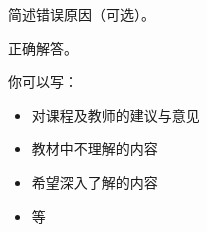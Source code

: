 \documentclass[11pt, a4paper, UTF8]{ctexart}
\begin{document}
\begin{cause}
  简述错误原因（可选）。
\end{cause}

\begin{revision}
  正确解答。
\end{revision}
\beginfb	%

你可以写：
\begin{itemize}
  \item 对课程及教师的建议与意见
  \item 教材中不理解的内容
  \item 希望深入了解的内容
  \item 等
\end{itemize}
\end{document}
